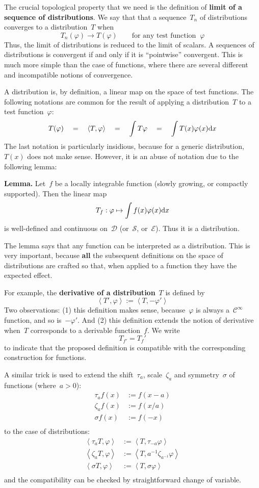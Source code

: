 The crucial topological property that we need is the definition of
{\bf limit of a sequence of distributions}.  We say that that a
sequence~$T_n$ of distributions converges to a distribution~$T$ when
$$
T_n(\varphi)\to T(\varphi)\qquad\textrm{for any test function }\ \varphi
$$
Thus, the limit of distributions is reduced to the limit of scalars.
A sequences of distributions is convergent if and only if it is
``pointwise'' convergent.  This is much more simple than the case of
functions, where there are several different and incompatible notions
of convergence.

A distribution is, by definition, a linear map on the space of test
functions.  The following notations are common for the result of
applying a distribution~$T$ to a test function~$\varphi$:
$$
T(\varphi)
\quad=\quad
\left<T,\varphi\right>
\quad=\quad
\int T\varphi
\quad=\quad
\int T(x)\varphi(x)\mathrm{d} x
$$
The last notation is particularly insidious, because for a generic
distribution,~$T(x)$ does not make sense.  However, it is an abuse of
notation due to the following lemma:

{\bf Lemma.}  Let~$f$ be a locally integrable function (slowly
growing, or compactly supported).  Then the linear map
$$
T_f : \varphi\mapsto\int f(x)\varphi(x)\mathrm{d} x
$$
is well-defined and continuous on~$\mathcal{D}$ (or~$\mathcal{S}$,
or~$\mathcal{E}$).  Thus it is a distribution.

The lemma says that any function can be interpreted as a
distribution.
This is very important, because {\bf all} the subsequent
definitions on the space of distributions are crafted so that, when
applied to a function they have the expected effect.

For example, the {\bf derivative of a distribution}~$T$ is defined by
$$
\left<T',\varphi\right>
:=
\left<T,-\varphi'\right>
$$
Two observations: (1) this definition makes sense, because~$\varphi$
is always a~$\mathcal{C}^\infty$ function, and so is~$-\varphi'$.
And (2) this definition extends the notion of derivative when~$T$
corresponds to a derivable function~$f$.  We write
$$
T_{f'}= {T_f}'
$$
to indicate that the proposed definition is compatible with the
corresponding construction for functions.

A similar trick is used to extend the shift~$\tau_a$, scale~$\zeta_a$ and
symmetry~$\sigma$ of functions (where~$a>0$):
\begin{eqnarray*}
	\tau_a f(x) &:= f(x-a) \\
	\zeta_a f(x) &:= f(x/a) \\
	\sigma f(x) &:= f(-x) \\
\end{eqnarray*}
to the case of distributions:
\begin{eqnarray*}
	\left<\tau_a T,\varphi\right> &:= \left<T,\tau_{-a}\varphi\right> \\
	\left<\zeta_a T,\varphi\right> &:= \left<T,a^{-1}\zeta_{a^{-1}}\varphi\right> \\
	\left<\sigma T,\varphi\right> &:= \left<T,\sigma\varphi\right> \\
\end{eqnarray*}
and the compatibility can be checked by straightforward change of
variable.

